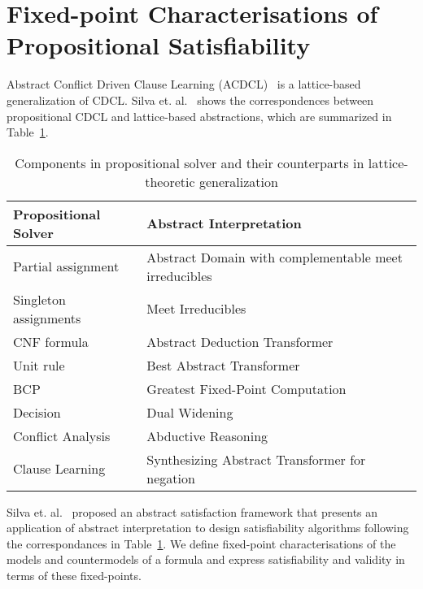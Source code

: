 \section{Fixed-point Characterisations of Propositional Satisfiability}
%
Abstract Conflict Driven Clause Learning (ACDCL)~\cite{dhk2013-popl} is a 
lattice-based generalization of CDCL.  Silva et. al.~\cite{sas12}
shows the correspondences between propositional CDCL and lattice-based
abstractions, which are summarized in Table~\ref{connection}.  
%
\begin{table}[]
\centering
\caption{Components in propositional solver and their counterparts in lattice-theoretic generalization}
\label{connection}
\begin{tabular}{ll}
\toprule
  Propositional Solver & Abstract Interpretation \\
  \midrule
Partial assignment & Abstract Domain with complementable meet irreducibles \\
Singleton assignments & Meet Irreducibles   \\
CNF formula & Abstract Deduction Transformer    \\
Unit rule & Best Abstract Transformer \\
BCP & Greatest Fixed-Point Computation \\
Decision & Dual Widening \\ 
Conflict Analysis & Abductive Reasoning \\
Clause Learning & Synthesizing Abstract Transformer for negation \\ 
\bottomrule
\end{tabular}
\end{table}
%


Silva et. al.~\cite{popl2014} proposed an abstract satisfaction framework that 
presents an application of abstract interpretation to design satisfiability algorithms 
following the correspondances in Table~\ref{connection}.  
%
We define fixed-point characterisations of the models and countermodels of a
formula and express satisfiability and validity in terms of these fixed-points.


